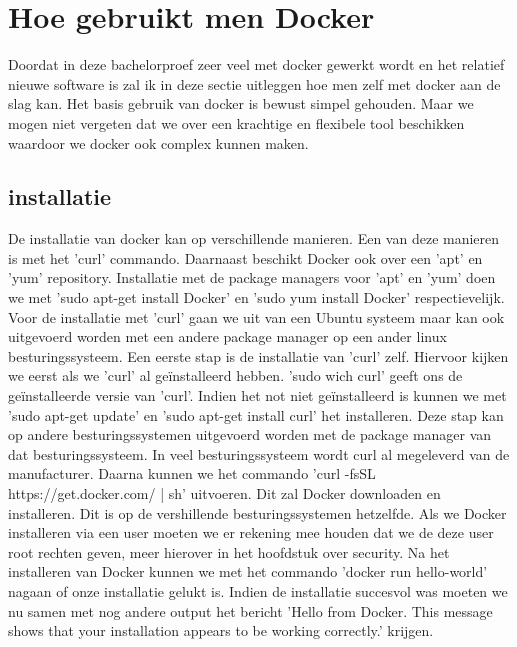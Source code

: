 \section{Hoe gebruikt men Docker}

Doordat in deze bachelorproef zeer veel met docker gewerkt wordt en het relatief nieuwe software is zal ik in deze sectie uitleggen hoe men zelf met docker aan de slag kan. Het basis gebruik van docker is bewust simpel gehouden. Maar we mogen niet vergeten dat we over een krachtige en flexibele tool beschikken waardoor we docker ook complex kunnen maken.

\subsection{installatie}

De installatie van docker kan op verschillende manieren. Een van deze manieren is met het 'curl' commando. Daarnaast beschikt Docker ook over een 'apt' en 'yum' repository. Installatie met de package managers voor 'apt' en 'yum' doen we met 'sudo apt-get install Docker' en 'sudo yum install Docker' respectievelijk. Voor de installatie met 'curl' gaan we uit van een Ubuntu systeem maar kan ook uitgevoerd worden met een andere package manager op een ander linux besturingssysteem. Een eerste stap is de installatie van 'curl' zelf. Hiervoor kijken we eerst als we 'curl' al geïnstalleerd hebben. 'sudo wich curl' geeft ons de geïnstalleerde versie van 'curl'. Indien het not niet geïnstalleerd is kunnen we met 'sudo apt-get update' en 'sudo apt-get install curl' het installeren. Deze stap kan op andere besturingssystemen uitgevoerd worden met de package manager van dat besturingssysteem. In veel besturingssysteem wordt curl al megeleverd van de manufacturer. Daarna kunnen we het commando 'curl -fsSL https://get.docker.com/ | sh' uitvoeren. Dit zal Docker downloaden en installeren. Dit is op de vershillende besturingssystemen hetzelfde. Als we Docker installeren via een user moeten we er rekening mee houden dat we de deze user root rechten geven, meer hierover in het hoofdstuk over security. Na het installeren van Docker kunnen we met het commando 'docker run hello-world' nagaan of onze installatie gelukt is. Indien de installatie succesvol was moeten we nu samen met nog andere output het bericht 'Hello from Docker. This message shows that your installation appears to be working correctly.' krijgen.


